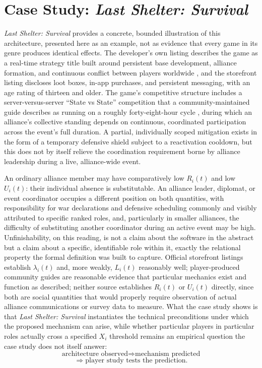 \section{Case Study: \emph{Last Shelter: Survival}}

\emph{Last Shelter: Survival} provides a concrete, bounded illustration of this architecture, presented here as an example, not as evidence that every game in its genre produces identical effects. The developer's own listing describes the game as a real-time strategy title built around persistent base development, alliance formation, and continuous conflict between players worldwide \cite{lastshelter_appstore,lastshelter_playstore}, and the storefront listing discloses loot boxes, in-app purchases, and persistent messaging, with an age rating of thirteen and older. The game's competitive structure includes a server-versus-server ``State vs State'' competition that a community-maintained guide describes as running on a roughly forty-eight-hour cycle \cite{lastshelter_swvs,lastshelter_appgamer}, during which an alliance's collective standing depends on continuous, coordinated participation across the event's full duration. A partial, individually scoped mitigation exists in the form of a temporary defensive shield subject to a reactivation cooldown, but this does not by itself relieve the coordination requirement borne by alliance leadership during a live, alliance-wide event.

An ordinary alliance member may have comparatively low $R_i(t)$ and low $U_i(t)$: their individual absence is substitutable. An alliance leader, diplomat, or event coordinator occupies a different position on both quantities, with responsibility for war declarations and defensive scheduling commonly and visibly attributed to specific ranked roles, and, particularly in smaller alliances, the difficulty of substituting another coordinator during an active event may be high. Unfinishability, on this reading, is not a claim about the software in the abstract but a claim about a specific, identifiable role within it, exactly the relational property the formal definition was built to capture. Official storefront listings establish $\lambda_i(t)$ and, more weakly, $L_i(t)$ reasonably well; player-produced community guides are reasonable evidence that particular mechanics exist and function as described; neither source establishes $R_i(t)$ or $U_i(t)$ directly, since both are social quantities that would properly require observation of actual alliance communications or survey data to measure. What the case study shows is that \emph{Last Shelter: Survival} instantiates the technical preconditions under which the proposed mechanism can arise, while whether particular players in particular roles actually cross a specified $X_i$ threshold remains an empirical question the case study does not itself answer:
\[
\text{architecture observed} \Longrightarrow \text{mechanism predicted}
\]
\[
\Longrightarrow \text{player study tests the prediction}.
\]

